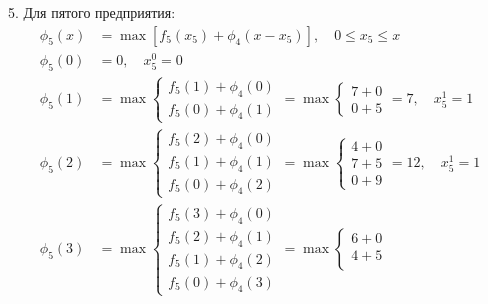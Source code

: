 \documentclass{article}
\begin{document}
5. Для пятого предприятия:
\[
    \begin{aligned}
        \phi_5(x) & = \max \left[ f_5(x_5) + \phi_4(x - x_5) \right], \quad 0 \leq x_5 \leq x \\
        \phi_5(0) & = 0, \quad x_5^0 = 0                                                      \\
        \phi_5(1) & = \max \begin{cases}
                               f_5(1) + \phi_4(0) \\
                               f_5(0) + \phi_4(1)
                           \end{cases} = \max \begin{cases}
                                                  7 + 0 \\
                                                  0 + 5
                                              \end{cases} = 7, \quad x_5^1 = 1                \\
        \phi_5(2) & = \max \begin{cases}
                               f_5(2) + \phi_4(0) \\
                               f_5(1) + \phi_4(1) \\
                               f_5(0) + \phi_4(2)
                           \end{cases} = \max \begin{cases}
                                                  4 + 0 \\
                                                  7 + 5 \\
                                                  0 + 9
                                              \end{cases} = 12, \quad x_5^1 = 1               \\
        \phi_5(3) & = \max \begin{cases}
                               f_5(3) + \phi_4(0) \\
                               f_5(2) + \phi_4(1) \\
                               f_5(1) + \phi_4(2) \\
                               f_5(0) + \phi_4(3)
                           \end{cases} = \max \begin{cases}
                                                  6 + 0 \\
                                                  4 + 5 \\

\end{cases}
\end{aligned}\]
\end{document}
